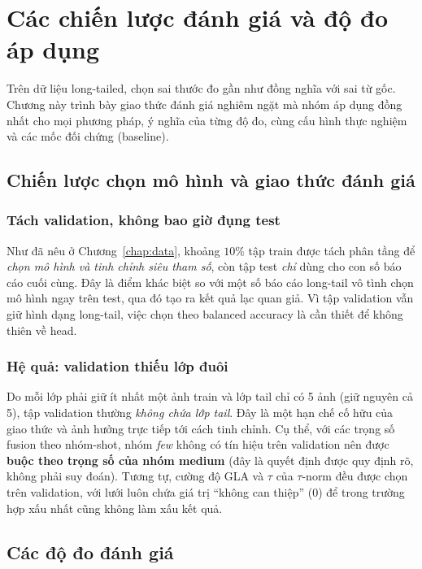 \chapter{Các chiến lược đánh giá và độ đo áp dụng}
\label{chap:eval}

Trên dữ liệu long-tailed, chọn sai thước đo gần như đồng nghĩa với sai từ gốc. Chương này trình bày
giao thức đánh giá nghiêm ngặt mà nhóm áp dụng đồng nhất cho mọi phương pháp, ý nghĩa của từng độ
đo, cùng cấu hình thực nghiệm và các mốc đối chứng (baseline).

\section{Chiến lược chọn mô hình và giao thức đánh giá}

\subsection{Tách validation, không bao giờ đụng test}
Như đã nêu ở Chương~\ref{chap:data}, khoảng $10\%$ tập train được tách phân tầng để \emph{chọn mô
hình và tinh chỉnh siêu tham số}, còn tập test \emph{chỉ} dùng cho con số báo cáo cuối cùng. Đây là điểm khác biệt so với một số báo cáo long-tail vô tình chọn mô hình ngay
trên test, qua đó tạo ra kết quả lạc quan giả. Vì tập validation vẫn giữ hình dạng long-tail, việc
chọn theo balanced accuracy là cần thiết để không thiên về head.

\subsection{Hệ quả: validation thiếu lớp đuôi}
Do mỗi lớp phải giữ ít nhất một ảnh train và lớp tail chỉ có 5 ảnh (giữ nguyên cả 5), tập validation
thường \emph{không chứa lớp tail}. Đây là một hạn chế cố hữu của giao thức và ảnh hưởng trực tiếp
tới cách tinh chỉnh. Cụ thể, với các trọng số fusion theo nhóm-shot, nhóm \emph{few} không có tín
hiệu trên validation nên được \textbf{buộc theo trọng số của nhóm medium} (đây là quyết định được
quy định rõ, không phải suy đoán). Tương tự, cường độ GLA và $\tau$ của $\tau$-norm đều được
chọn trên validation, với lưới luôn chứa giá trị ``không can thiệp'' ($0$) để trong trường hợp xấu
nhất cũng không làm xấu kết quả.

\section{Các độ đo đánh giá}
\label{sec:metrics}

